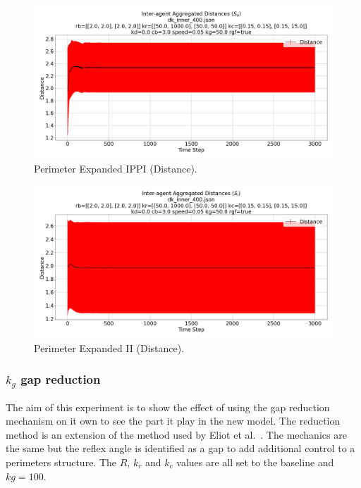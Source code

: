 \documentclass[12pt,a4paper]{IEEEtran}
\newcommand{\kc}{\mathit{k_{c}}}
\newcommand{\kr}{\mathit{k_{r}}}
\newcommand{\kg}{\mathit{k_{g}}}
\newcommand{\rb}{\mathit{R}}
\begin{document}
\begin{figure}[H]
	\begin{center}
		\includegraphics[width=1.0\linewidth]{figures/innerDistanceIPPI}
	\end{center}
	\caption{Perimeter Expanded IPPI (Distance). \label{fig:perimExpandDistanceIPPI}}
\end{figure}

\begin{figure}[H]
	\begin{center}
		\includegraphics[width=1.0\linewidth]{figures/innerDistanceII}
	\end{center}
	\caption{Perimeter Expanded II (Distance). \label{fig:perimExpandDistanceII}}
\end{figure}

\subsubsection{$\kg$ gap reduction}

The aim of this experiment is to show the effect of using the gap reduction mechanism on it own to see the part it play in the new model. The reduction method is an extension of the method used by Eliot et al.~\cite{eliot2018metric}. The mechanics are the same but the reflex angle is identified as a gap to add additional control to a perimeters structure. The $\rb$, $\kr$ and $\kc$ values are all set to the baseline and $kg=100$.
\end{document}
